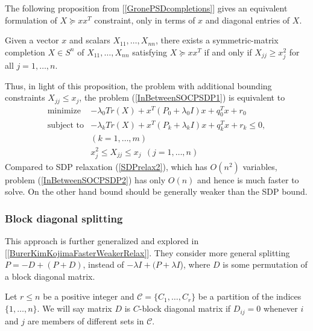 \documentclass[12pt]{book}
\theoremstyle{definition}
\begin{document}
The following proposition from [\ref{GronePSDcompletions}] gives an equivalent formulation of $X\succeq xx^T$ constraint, only in terms of $x$ and diagonal entries of $X$.

\prop[{[\ref{GronePSDcompletions}]}]
\label{PropGronePSDcompletion} Given a vector $x$ and scalars $X_{11},\dots ,X_{nn}$, there exists
a symmetric-matrix completion $X\in S^n$ of $X_{11},\dots ,X_{nn}$ satisfying $X \succeq xx^T$ if and only if $X_{jj} \geq x^2_j$ for all $j = 1,\dots ,n.$ \rm 

Thus, in light of this proposition, the problem with additional bounding constraints $X_{jj}\leq x_j$, the problem (\ref{InBetweenSOCPSDP1}) is equivalent to 
\begin{equation}
\label{InBetweenSOCPSDP2}
\begin{array}{ll}
\mbox{minimize}& -\lambda_0 Tr(X) +  x^T(P_0+\lambda_0 I)x + q_0^Tx + r_0 \\
\mbox{subject to}& -\lambda_k Tr(X) +  x^T(P_k+\lambda_kI)x + q_k^Tx + r_k \leq 0, \\ &(k = 1,\dots ,m) \\
& x_j^2\leq X_{jj} \leq x_j \ \ (j = 1,\dots ,n)
\end{array} 
\end{equation}
Compared to SDP relaxation (\ref{SDPrelax2}), which has $O(n^2)$ variables, problem (\ref{InBetweenSOCPSDP2}) has only $O(n)$ and hence is much faster to solve. On the other hand bound should be generally weaker than the SDP bound.


\subsubsection{Block diagonal splitting}
This approach is further generalized and explored in [\ref{BurerKimKojimaFasterWeakerRelax}]. 
They consider more general splitting $P= -D + (P+D)$, instead of $-\lambda I + (P +\lambda I$), where $D$ is some permutation of a block diagonal matrix. 


Let $r\leq n$ be a positive integer and $\mathcal{C} = \{C_1,\dots , C_r\}$ be a partition of the indices $\{1,\dots ,n\}$. 
We will say matrix $D$ is $C$-block diagonal matrix if $D_{ij} = 0$ whenever $i$ and $j$ are members of different sets in $\mathcal{C}$. 
\end{document}

